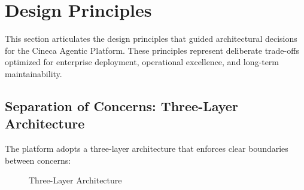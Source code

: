 
\section{Design Principles}
\label{sec:design-principles}

This section articulates the design principles that guided architectural decisions for the Cineca Agentic Platform. These principles represent deliberate trade-offs optimized for enterprise deployment, operational excellence, and long-term maintainability.

\subsection{Separation of Concerns: Three-Layer Architecture}
\label{subsec:three-layer}

The platform adopts a three-layer architecture that enforces clear boundaries between concerns:

\begin{figure}[htbp]
\centering
{}
\caption{Three-Layer Architecture}
\label{fig:three-layer}
\end{figure}

